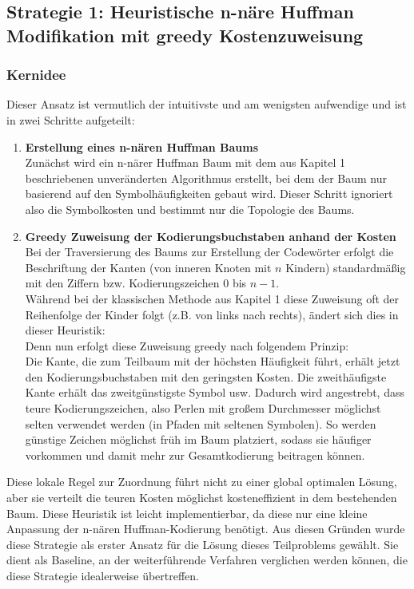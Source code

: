 \documentclass[a4paper,10pt,ngerman]{scrartcl}
\begin{document}
\subsection{Strategie 1: Heuristische n-näre Huffman Modifikation mit greedy Kostenzuweisung}
\subsubsection{Kernidee}
Dieser Ansatz ist vermutlich der intuitivste und am wenigsten aufwendige und ist in zwei Schritte aufgeteilt: 
\\\newline
\begin{enumerate}
  \item \textbf{Erstellung eines n-nären Huffman Baums} \\
      Zunächst wird ein n-närer Huffman Baum mit dem aus Kapitel 1 beschriebenen unveränderten Algorithmus erstellt, bei dem der Baum nur basierend auf den Symbolhäufigkeiten gebaut wird. Dieser Schritt ignoriert also die Symbolkosten und bestimmt nur die Topologie des Baums. 
  \item \textbf{Greedy Zuweisung der Kodierungsbuchstaben anhand der Kosten}\\
  Bei der Traversierung des Baums zur Erstellung der Codewörter erfolgt die Beschriftung der Kanten (von inneren Knoten mit $n$ Kindern) standardmäßig mit den Ziffern bzw. Kodierungszeichen $0$ bis $n-1$.\\
  Während bei der klassischen Methode aus Kapitel 1 diese Zuweisung oft der Reihenfolge der Kinder folgt (z.B. von links nach rechts), ändert sich dies in dieser Heuristik:\\
  Denn nun erfolgt diese Zuweisung greedy nach folgendem Prinzip: \\
  Die Kante, die zum Teilbaum mit der höchsten Häufigkeit führt, erhält jetzt den Kodierungsbuchstaben mit den geringsten Kosten. Die zweithäufigste Kante erhält das zweitgünstigste Symbol usw. Dadurch wird angestrebt, dass teure Kodierungszeichen, also Perlen mit großem Durchmesser möglichst selten verwendet werden (in Pfaden mit seltenen Symbolen). So werden günstige Zeichen möglichst früh im Baum platziert, sodass sie häufiger vorkommen und damit mehr zur Gesamtkodierung beitragen können.\\
\end{enumerate}
Diese lokale Regel zur Zuordnung führt nicht zu einer global optimalen Lösung, aber sie verteilt die teuren Kosten möglichst kosteneffizient in dem bestehenden Baum. Diese Heuristik ist leicht implementierbar, da diese nur eine kleine Anpassung der n-nären Huffman-Kodierung benötigt. Aus diesen Gründen wurde diese Strategie als erster Ansatz für die Lösung dieses Teilproblems gewählt. Sie dient als Baseline, an der weiterführende Verfahren verglichen werden können, die diese Strategie idealerweise übertreffen. 
\end{document}
